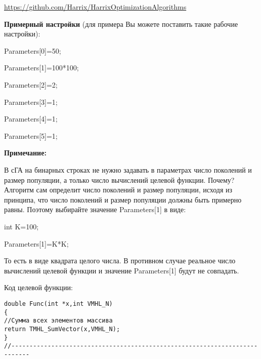 \documentclass[a4paper,12pt]{article}
\begin{document}
\href{https://github.com/Harrix/HarrixOptimizationAlgorithms/blob/master/\_HarrixOptimizationAlgorithms.pdf}{https://github.com/Harrix/HarrixOptimizationAlgorithms}


\textbf{Примерный настройки} (для примера Вы можете поставить такие рабочие настройки):

 Parameters[0]=50;
 
Parameters[1]=100*100;

Parameters[2]=2;

Parameters[3]=1;

Parameters[4]=1;

Parameters[5]=1;


\textbf{Примечание:}

 В сГА на бинарных строках не нужно задавать в параметрах число поколений и размер популяции, а только число вычислений целевой функции. Почему? Алгоритм сам определит число поколений и размер популяции, исходя из принципа, что число поколений и размер популяции должны быть примерно равны. Поэтому выбирайте значение Parameters[1] в виде:

int K=100;

Parameters[1]=K*K;

То есть в виде квадрата целого числа. В противном случае реальное число вычислений целевой функции и значение Parameters[1] будут не совпадать.

Код целевой функции:
\begin{lstlisting}[caption=Оптимизируемая функция]
double Func(int *x,int VMHL_N)
{
//Сумма всех элементов массива
return TMHL_SumVector(x,VMHL_N);
}
//---------------------------------------------------------------------------
\end{lstlisting}
\end{document}
